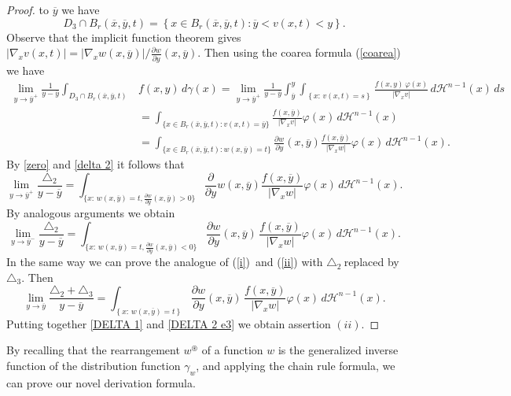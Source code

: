 \documentclass[a4paper,10pt,reqno]{amsart}
\numberwithin{equation}{section}
\begin{document}
\begin{proof}
to $\overline{y}$ we have
\[
D_{3}\cap B_{r}(\overline{x},\overline{y},t)=\left\{  x\in B_{r}(\overline
{x},\overline{y},t):\overline{y}<v(x,t)<y\right\}  .
\]
Observe that the implicit function theorem gives $|\nabla_{x}v(x,t)|=|\nabla_{x}w(x,\overline{y})|/\frac{\partial w}{\partial y}
(x,\overline{y})$. Then using the coarea formula (\ref{coarea})
we have
\begin{equation}\label{delta 2}
\begin{aligned}
\underset{y\rightarrow\overline{y}^{+}}{\lim}\frac{1}{y-\overline{y}}\int_{D_{3}\cap B_{r}(\overline{x},\overline{y},t)}
&f(x,y)\,d\gamma(x)
=\underset{y\rightarrow\overline{y}^{+}}{\lim}\frac{1}{y-\overline{y}}\int_{\overline{y}}^{y}\int_{\left\{x:\,v(x,t)=s\right\}}
\frac{f(x,y)\,\varphi(x)}{|\nabla_{x}v|}\,d\mathcal{H}^{n-1}(x)\,ds\\
&=\int_{\{x\in B_{r}(\overline{x},\overline{y},t):v(x,t)=\overline{y}\}}\frac{f(x,\overline{y})}{\left\vert \nabla
_{x}v\right\vert }\varphi(x)\,d\mathcal{H}^{n-1}(x)\\
&=\int_{\{x\in B_{r}(\overline{x},\overline{y},t):w(x,\overline{y})=t\}}\frac{\partial w}{\partial y}
(x,\overline{y})\frac{f(x,\overline{y})}{|\nabla_{x}w|}\varphi(x)\,d\mathcal{H}^{n-1}(x).
\end{aligned}
\end{equation}
By \eqref{zero} and \eqref{delta 2} it follows that
\begin{equation}
\underset{y\rightarrow\overline{y}^{+}}{\lim}\frac{\triangle_{2}}
{y-\overline{y}}=\int_{\{x:\,w(x,\overline{y})=t,\frac{\partial w}{\partial
y}(x,\overline{y})>0\}}\frac{\partial}{\partial y}w(x,\overline
{y})\frac{f(x,\overline{y})}{|\nabla_{x}w|}\varphi(x)\,d\mathcal{H}^{n-1}(x).
\label{i}%
\end{equation}
By analogous arguments we obtain
\begin{equation}
\underset{y\rightarrow\overline{y}^{-}}{\lim}\frac{\triangle_{2}}%
{y-\overline{y}}=\int_{\{x:\,w(x,\overline{y})=t,\frac{\partial w}{\partial
y}(x,\overline{y})<0\}}\frac{\partial w}{\partial y}(x,\overline
{y})\,\frac{f(x,\overline{y})}{\left\vert \nabla_{x}w\right\vert }\varphi(x)\,d\mathcal{H}^{n-1}(x).
\label{ii}%
\end{equation}
In the same way we can prove the analogue of (\ref{i})\ and (\ref{ii}) with
$\triangle_{2}\ $replaced by $\triangle_{3}.$ Then%
\begin{equation}
\underset{y\rightarrow\overline{y}}{\lim}\frac{\triangle_{2}+\triangle_{3}%
}{y-\overline{y}}=\int_{\left\{  x:\,w(x,\overline{y})=t\right\}  }%
\frac{\partial w}{\partial y}(x,\overline{y})\,\frac{f(x,\overline{y}%
)}{\left\vert \nabla_{x}w\right\vert }\varphi(x)\,d\mathcal{H}^{n-1}(x).
\label{DELTA 2 e3}%
\end{equation}
Putting together \eqref{DELTA 1} and \eqref{DELTA 2 e3} we obtain assertion $(ii)$.
\end{proof}
By recalling that the rearrangement $w^{\circledast}$ of a function $w$ is the
generalized inverse function of the distribution function $\gamma_{w}$, and
applying the chain rule formula, we can prove our novel derivation formula.
\end{document}
